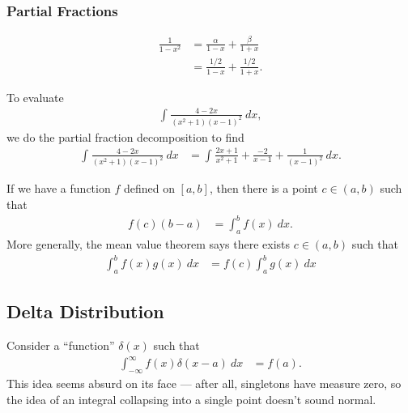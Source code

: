 \documentclass[10pt]{mypackage}
\begin{document}
\subsubsection{Partial Fractions}%
\begin{example}
  \begin{align*}
    \frac{1}{1-x^2} &= \frac{\alpha}{1-x} + \frac{\beta}{1+x}\\
                    &= \frac{1/2}{1-x} + \frac{1/2}{1+x}.
  \end{align*}
\end{example}
\begin{example}
  To evaluate
  \begin{align*}
    \int_{}^{} \frac{4-2x}{\left(x^2 + 1\right) \left( x-1\right)^2}\:dx,
  \end{align*}
  we do the partial fraction decomposition to find
  \begin{align*}
    \int_{}^{} \frac{4-2x}{\left(x^2 + 1\right) \left( x-1\right)^2}\:dx &= \int_{}^{} \frac{2x+1}{x^2 + 1} + \frac{-2}{x-1} + \frac{1}{\left(x-1\right)^2}\:dx.
  \end{align*}
\end{example}
\begin{example}
  If we have a function $f$ defined on $[a,b]$, then there is a point $c\in \left(a,b\right)$ such that
  \begin{align*}
    f(c)\left(b-a\right) &= \int_{a}^{b} f(x)\:dx.
  \end{align*}
  More generally, the mean value theorem says there exists $c\in \left(a,b\right)$ such that
  \begin{align*}
    \int_{a}^{b} f(x)g(x)\:dx &= f(c)\int_{a}^{b} g(x)\:dx
  \end{align*}
\end{example}
\subsection{Delta Distribution}%
Consider a ``function'' $\delta(x)$ such that
\begin{align*}
  \int_{-\infty}^{\infty} f(x)\delta(x-a)\:dx &= f(a).
\end{align*}
This idea seems absurd on its face --- after all, singletons have measure zero, so the idea of an integral collapsing into a single point doesn't sound normal.\newline
\end{document}
